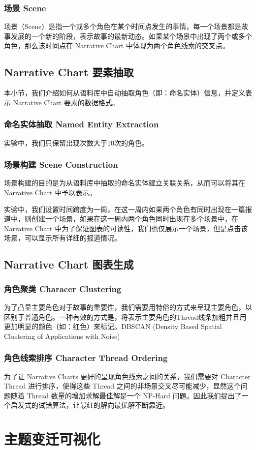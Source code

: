 \subsubsection{场景 Scene}
场景（Scene）是指一个或多个角色在某个时间点发生的事情，每一个场景都是故事发展的一个新的阶段，表示故事的最新动态。如果某个场景中出现了两个或多个角色，那么该时间点在 Narrative Chart 中体现为两个角色线索的交叉点。

\subsection{Narrative Chart 要素抽取}
本小节，我们介绍如何从语料库中自动抽取角色（即：命名实体）信息，并定义表示 Narrative Chart 要素的数据格式。

\subsubsection{命名实体抽取 Named Entity Extraction}
实验中，我们只保留出现次数大于10次的角色。

\subsubsection{场景构建 Scene Construction}
场景构建的目的是为从语料库中抽取的命名实体建立关联关系，从而可以将其在 Narrative Chart 中予以表示。

实验中，我们设置时间跨度为一周，在这一周内如果两个角色有同时出现在一篇报道中，则创建一个场景，如果在这一周内两个角色同时出现在多个场景中，在 Narrative Chart 中为了保证图表的可读性，我们也仅展示一个场景，但是点击该场景，可以显示所有详细的报道情况。

\subsection{Narrative Chart 图表生成}

 \subsubsection{角色聚类 Characer Clustering}
为了凸显主要角色对于故事的重要性，我们需要用特俗的方式来呈现主要角色，以区别于普通角色。一种有效的方式是，将表示主要角色的Thread线条加粗并且用更加明显的颜色（如：红色）来标记。DBSCAN (Density Based Spatial Clustering of Applications with Noise)
 
 \subsubsection{角色线索排序 Character Thread Ordering}
 为了让 Narrative Charts 更好的呈现角色线索之间的关系，我们需要对 Character Thread 进行排序，使得这些 Thread 之间的非场景交叉尽可能减少，显然这个问题随着 Thread 数量的增加求解最佳解是一个 NP-Hard 问题。因此我们提出了一个启发式的试错算法，让最红的解向最优解不断靠近。



\section{主题变迁可视化}